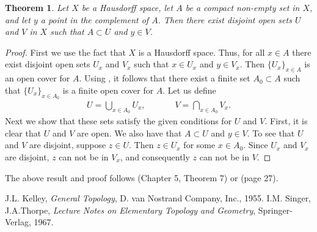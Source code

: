 \documentclass[12pt]{article}
\newtheorem*{thm}{Theorem}
\begin{document}
\begin{thm} Let $X$ be a Hausdorff space, let $A$ be a compact
non-empty set in $X$, and let $y$ a point in the complement of $A$. 
Then there exist disjoint open sets $U$ and $V$ in $X$ such that 
$A\subset U$ and $y\in V$. 
\end{thm}

\begin{proof} 
First we use the fact that $X$ is a Hausdorff space. 
Thus, for all $x\in A$ there exist
disjoint open sets $U_x$ and $V_x$ such that $x\in U_x$ and $y\in V_x$. 
Then $\{U_x\}_{x\in A}$ is an open cover for $A$. 
Using , 
it follows that there
exist a finite set $A_0\subset A$ such that $\{U_x\}_{x\in A_0}$
is a finite open cover for $A$. 
Let us define
\begin{eqnarray*}
U= \bigcup_{x\in A_0} U_x,\,\,\,\,\,&\,&\,\,\,\,\, V= \bigcap_{x\in A_0} V_x.
\end{eqnarray*}
Next we show  that these sets satisfy the given conditions 
for $U$ and $V$. First, it is clear
that $U$ and $V$ are open. We also have that $A\subset U$ and $y\in V$. 
To see that $U$ and $V$ are disjoint, suppose $z\in U$. Then
$z\in U_x$ for some $x\in A_0$. 
Since $U_x$ and $V_x$ are disjoint, $z$ can not be in $V_x$, and 
consequently $z$ can not be in $V$.
\end{proof}

The above result and proof follows \cite{kelley} (Chapter 5, Theorem 7) or \cite{singer} (page 27).

\begin{thebibliography}{9}
 J.L. Kelley, \emph{General Topology},
D. van Nostrand Company, Inc., 1955.
 I.M. Singer, J.A.Thorpe,
\emph{Lecture Notes on Elementary Topology and Geometry},
Springer-Verlag, 1967.
\end{thebibliography}
\end{document}
